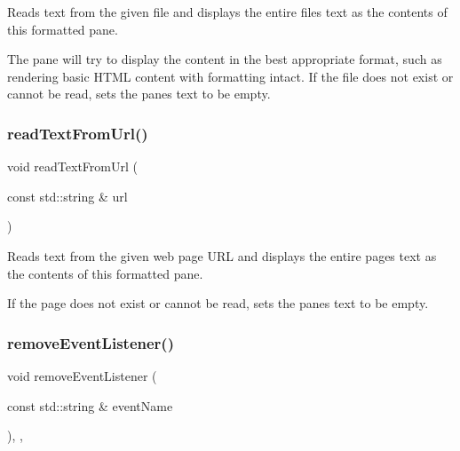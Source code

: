 Reads text from the given file and displays the entire file\textquotesingle{}s text as the contents of this formatted pane. 

The pane will try to display the content in the best appropriate format, such as rendering basic H\+T\+ML content with formatting intact. If the file does not exist or cannot be read, sets the pane\textquotesingle{}s text to be empty. \mbox{\label{classGBrowserPane_a68ff415e722130964bc9e1de826f4869}} 
\subsubsection{\texorpdfstring{read\+Text\+From\+Url()}{readTextFromUrl()}}
{\footnotesize\ttfamily void read\+Text\+From\+Url (\begin{DoxyParamCaption}\item[{const std\+::string \&}]{url }\end{DoxyParamCaption})\hspace{0.3cm}{\ttfamily [virtual]}}



Reads text from the given web page U\+RL and displays the entire page\textquotesingle{}s text as the contents of this formatted pane. 

If the page does not exist or cannot be read, sets the pane\textquotesingle{}s text to be empty. \mbox{\label{classGObservable_acbcf1ed3a851ad8a3c17ef38d86b481d}} 
\subsubsection{\texorpdfstring{remove\+Event\+Listener()}{removeEventListener()}}
{\footnotesize\ttfamily void remove\+Event\+Listener (\begin{DoxyParamCaption}\item[{const std\+::string \&}]{event\+Name }\end{DoxyParamCaption})\hspace{0.3cm}{\ttfamily [protected]}, {\ttfamily [virtual]}, {\ttfamily [inherited]}}



